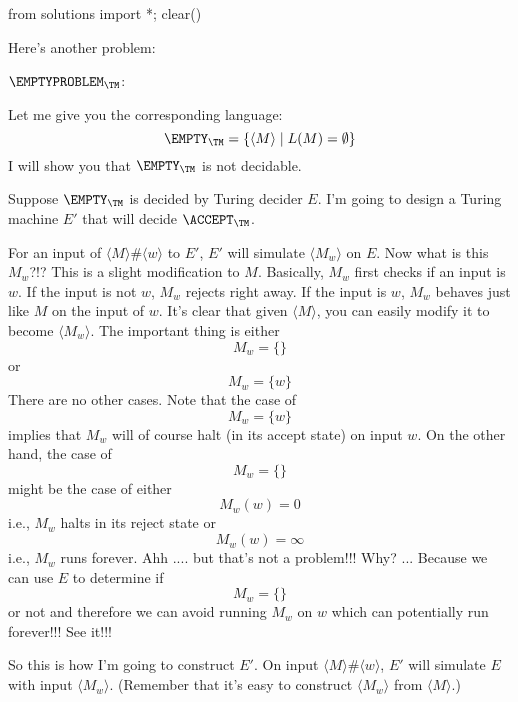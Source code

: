 \begin{python0}
from solutions import *; clear()
\end{python0}

Here's another problem:

$\EMPTYPROBLEM_\TM$\tinysidebar{$\EMPTYPROBLEM_\TM$}: 

Let me give you the corresponding language:
\[
\EMPTY_\TM
= \{ \langle M \rangle \mid L(M) = \emptyset \}
\]
I will show you that $\EMPTY_\TM$ is not decidable.

Suppose $\EMPTY_\TM$ is decided by Turing decider $E$.
I'm going to design a Turing machine $E'$ that will decide
$\ACCEPT_\TM$.

For an input of $\langle M \rangle \# \langle w \rangle$
to $E'$, $E'$ will simulate 
$\langle M_w \rangle$ on $E$.
Now what is this $M_w$?!?
This is a slight modification to $M$.
Basically, $M_w$ first checks if an input is $w$.
If the input is not $w$, $M_w$ rejects right away.
If the input is $w$, $M_w$ behaves just like $M$ on the input of $w$.
It's clear that given $\langle M \rangle$,
you can easily modify it to become $\langle M_w \rangle$.
The important thing is either
\[
M_w = \{\}
\]
or 
\[
M_w = \{w\}
\]
There are no other cases.
Note that the case of 
\[
M_w = \{w\}
\]
implies that $M_w$ will of course halt (in its accept state)
on input $w$.
On the other hand, the case of
\[
M_w = \{\}
\]
might be the case of either 
\[
M_w(w) = 0
\]
i.e., $M_w$ halts in its reject state or 
\[
M_w(w) = \infty
\]
i.e., $M_w$ runs forever.
Ahh .... but that's not a problem!!!
Why? ... Because we can use $E$ to determine if 
\[
M_w = \{\}
\]
or not
and therefore we can avoid running $M_w$ on $w$ which 
can potentially run forever!!! 
See it!!!

So this is how I'm going to construct $E'$.
On input $\langle M \rangle \# \langle w \rangle$,
$E'$ will simulate 
$E$ with input $\langle M_w \rangle$.
(Remember that it's easy to construct 
$\langle M_w \rangle$ from $\langle M \rangle$.)

